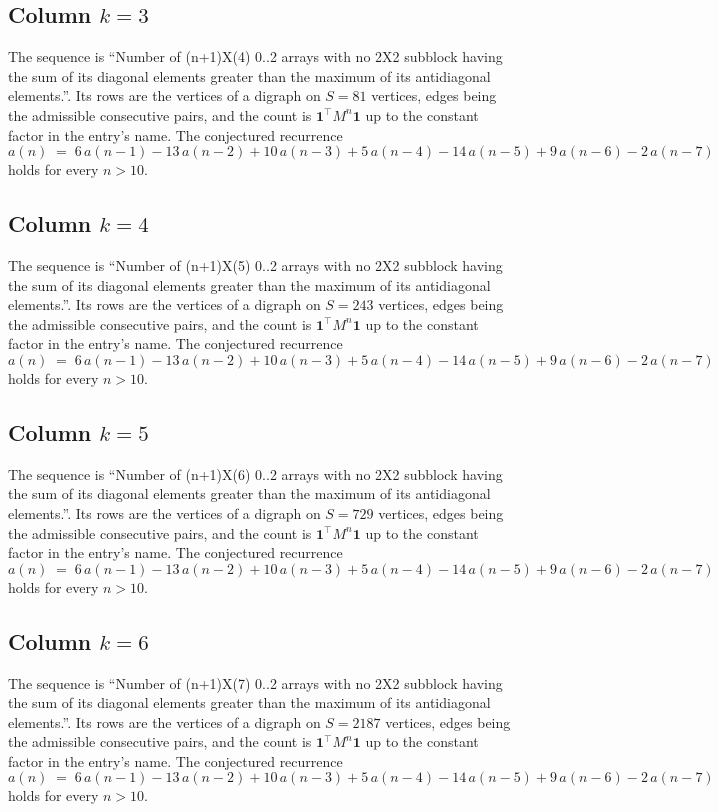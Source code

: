 \documentclass[11pt,a4paper]{article}
\theoremstyle{plain}
\theoremstyle{definition}
\begin{document}
\subsection*{Column $k=3$}
The sequence is ``Number of (n+1)X(4) 0..2 arrays with no 2X2 subblock having the sum of its diagonal elements greater than the maximum of its antidiagonal elements.''. Its rows are the vertices of a digraph on
$S=81$ vertices, edges being the admissible consecutive pairs, and the count is
$\mathbf{1}^{\!\top}M^{n}\mathbf{1}$ up to the constant factor in the entry's name.
The conjectured recurrence
\[
a(n)\;=\;6\,a(n-1) - 13\,a(n-2) + 10\,a(n-3) + 5\,a(n-4) - 14\,a(n-5) + 9\,a(n-6) - 2\,a(n-7)
\]
holds for every $n>10$.

\subsection*{Column $k=4$}
The sequence is ``Number of (n+1)X(5) 0..2 arrays with no 2X2 subblock having the sum of its diagonal elements greater than the maximum of its antidiagonal elements.''. Its rows are the vertices of a digraph on
$S=243$ vertices, edges being the admissible consecutive pairs, and the count is
$\mathbf{1}^{\!\top}M^{n}\mathbf{1}$ up to the constant factor in the entry's name.
The conjectured recurrence
\[
a(n)\;=\;6\,a(n-1) - 13\,a(n-2) + 10\,a(n-3) + 5\,a(n-4) - 14\,a(n-5) + 9\,a(n-6) - 2\,a(n-7)
\]
holds for every $n>10$.

\subsection*{Column $k=5$}
The sequence is ``Number of (n+1)X(6) 0..2 arrays with no 2X2 subblock having the sum of its diagonal elements greater than the maximum of its antidiagonal elements.''. Its rows are the vertices of a digraph on
$S=729$ vertices, edges being the admissible consecutive pairs, and the count is
$\mathbf{1}^{\!\top}M^{n}\mathbf{1}$ up to the constant factor in the entry's name.
The conjectured recurrence
\[
a(n)\;=\;6\,a(n-1) - 13\,a(n-2) + 10\,a(n-3) + 5\,a(n-4) - 14\,a(n-5) + 9\,a(n-6) - 2\,a(n-7)
\]
holds for every $n>10$.

\subsection*{Column $k=6$}
The sequence is ``Number of (n+1)X(7) 0..2 arrays with no 2X2 subblock having the sum of its diagonal elements greater than the maximum of its antidiagonal elements.''. Its rows are the vertices of a digraph on
$S=2187$ vertices, edges being the admissible consecutive pairs, and the count is
$\mathbf{1}^{\!\top}M^{n}\mathbf{1}$ up to the constant factor in the entry's name.
The conjectured recurrence
\[
a(n)\;=\;6\,a(n-1) - 13\,a(n-2) + 10\,a(n-3) + 5\,a(n-4) - 14\,a(n-5) + 9\,a(n-6) - 2\,a(n-7)
\]
holds for every $n>10$.
\end{document}
